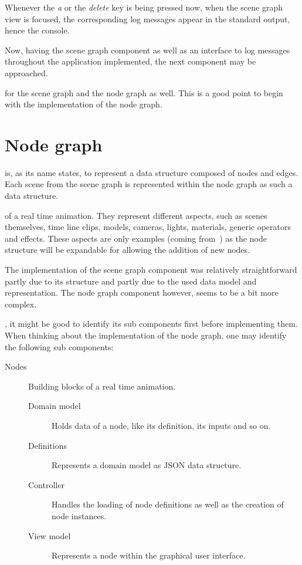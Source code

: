 \documentclass[%
    a4paper,    %
    justified,  %
    nobib,      %
    openany     %
]{tufte-book}
\makeatletter
\renewcommand{\label}[1]{\@tufte@label{##1}}%
\makeatother
\begin{document}
Whenever the \textit{a} or the \textit{delete} key is being pressed now, when
the scene graph view is focused, the corresponding log messages appear in the
standard output, hence the console.

Now, having the scene graph component as well as an interface to log messages
throughout the application implemented, the next component may be approached.

 for the scene graph and the node graph as
well. This is a good point to begin with the implementation of the node graph.


\chapter{Node graph}
\label{appendix:chap:node-graph}

 is, as its name states, to
represent a data structure composed of nodes and edges. Each scene from the
scene graph is represented within the node graph as such a data structure.

 of a real time animation. They
represent different aspects, such as scenes themselves, time line clips, models,
cameras, lights, materials, generic operators and effects. These aspects are
only examples (coming from~) as
the node structure will be expandable for allowing the addition of new nodes.

The implementation of the scene graph component was relatively straightforward
partly due to its structure and partly due to the used data model and
representation. The node graph component however, seems to be a bit more complex.

, it might be
good to identify its sub components first before implementing them. When
thinking about the implementation of the node graph, one may identify the
following sub components:

\begin{description}
\item[Nodes] Building blocks of a real time animation.
  \begin{description}
    \item[Domain model] Holds data of a node, like its definition, its inputs
                        and so on.
    \item[Definitions]  Represents a domain model as JSON data structure.
    \item[Controller]   Handles the loading of node definitions as well as the
                        creation of node instances.
    \item[View model]   Represents a node within the graphical user interface.
  \end{description}
\end{description}
\end{document}
